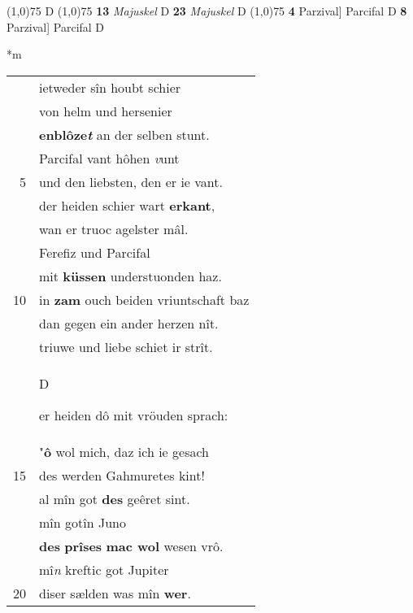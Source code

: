 \documentclass[8pt,a4paper,notitlepage]{article}
\begin{document}
\begin{table}[ht]
\begin{minipage}[t]{0.5\linewidth}
\begin{tabular}{rl}
\end{tabular}
\scriptsize
\line(1,0){75} \newline
D \newline
\line(1,0){75} \newline
\textbf{13} \textit{Majuskel} D  \textbf{23} \textit{Majuskel} D  \newline
\line(1,0){75} \newline
\textbf{4} Parzival] Parcifal D \textbf{8} Parzival] Parcifal D \newline
\end{minipage}
\hspace{0.5cm}
\begin{minipage}[t]{0.5\linewidth}
\small
\begin{center}*m
\end{center}
\begin{tabular}{rl}
 & ietweder sîn houbt schier\\ 
 & von helm und hersenier\\ 
 & \textbf{enblôze\textit{t}} an der selben stunt.\\ 
 & Parcifal vant hôhen \textit{v}unt\\ 
5 & und den liebsten, den er ie vant.\\ 
 & der heiden schier wart \textbf{erkant},\\ 
 & wan er truoc agelster mâl.\\ 
 & Ferefiz und Parcifal\\ 
 & mit \textbf{küssen} understuonden haz.\\ 
10 & in \textbf{zam} ouch beiden vriuntschaft baz\\ 
 & dan gegen ein ander herzen nît.\\ 
 & triuwe und liebe schiet ir strît.\\ 
 & \begin{large}D\end{large}er heiden dô mit vröuden sprach:\\ 
 & "\textbf{ô} wol mich, daz ich ie gesach\\ 
15 & des werden Gahmuretes kint!\\ 
 & al mîn got \textbf{des} geêret sint.\\ 
 & mîn gotîn Juno\\ 
 & \textbf{des} \textbf{prîses} \textbf{mac wol} wesen vrô.\\ 
 & mî\textit{n} kreftic got Jupiter\\ 
20 & diser sælden was mîn \textbf{wer}.\\ 

\end{tabular}
\end{minipage}
\end{table}
\end{document}
